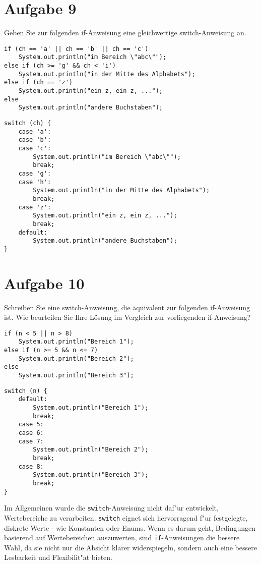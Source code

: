 \documentclass[10pt, oneside]{article}
\begin{document}
\pagebreak
\section{Aufgabe 9}

Geben Sie zur folgenden if-Anweisung eine gleichwertige switch-Anweisung an.

\begin{verbatim}
if (ch == 'a' || ch == 'b' || ch == 'c')
    System.out.println("im Bereich \"abc\"");
else if (ch >= 'g' && ch < 'i')
    System.out.println("in der Mitte des Alphabets");
else if (ch == 'z')
    System.out.println("ein z, ein z, ...");
else
    System.out.println("andere Buchstaben");
\end{verbatim}

\begin{verbatim}
switch (ch) {
    case 'a':
    case 'b':
    case 'c':
        System.out.println("im Bereich \"abc\"");
        break;
    case 'g':
    case 'h':
        System.out.println("in der Mitte des Alphabets");
        break;
    case 'z':
        System.out.println("ein z, ein z, ...");
        break;
    default:
        System.out.println("andere Buchstaben");
}
\end{verbatim}

\section{Aufgabe 10}

Schreiben Sie eine switch-Anweisung, die äquivalent zur folgenden if-Anweisung
ist. Wie beurteilen Sie Ihre Lösung im Vergleich zur vorliegenden if-Anweisung?

\begin{verbatim}
if (n < 5 || n > 8)
    System.out.println("Bereich 1");
else if (n >= 5 && n <= 7)
    System.out.println("Bereich 2");
else
    System.out.println("Bereich 3");
\end{verbatim}

\begin{verbatim}
switch (n) {
    default:
        System.out.println("Bereich 1");
        break;
    case 5:
    case 6:
    case 7:
        System.out.println("Bereich 2");
        break;
    case 8:
        System.out.println("Bereich 3");
        break;
}
\end{verbatim}

Im Allgemeinen wurde die \verb|switch|-Anweisung nicht daf"ur entwickelt,
Wertebereiche zu verarbeiten. \verb|switch| eignet sich hervorragend f"ur
festgelegte, diskrete Werte - wie Konstanten oder Enums. Wenn es darum geht,
Bedingungen basierend auf Wertebereichen auszuwerten, sind
\verb|if|-Anweisungen die bessere Wahl, da sie nicht nur die Absicht klarer
widerspiegeln, sondern auch eine bessere Lesbarkeit und Flexibilit"at bieten.
\end{document}
